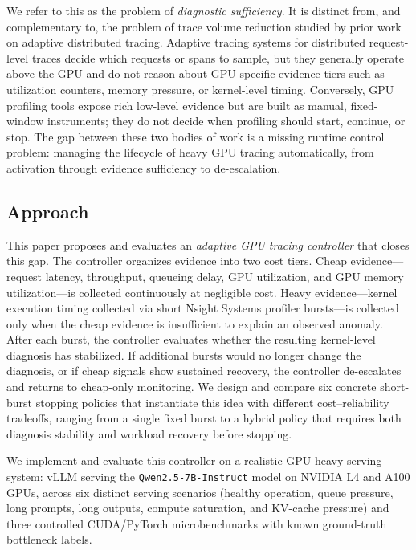 We refer to this as the problem of \emph{diagnostic sufficiency}.
It is distinct from, and complementary to, the problem of trace volume reduction studied by
prior work on adaptive distributed tracing.
Adaptive tracing systems for distributed request-level traces decide which requests or spans
to sample, but they generally operate above the GPU and do not reason about GPU-specific
evidence tiers such as utilization counters, memory pressure, or kernel-level timing.
Conversely, GPU profiling tools expose rich low-level evidence but are built as manual,
fixed-window instruments; they do not decide when profiling should start, continue, or stop.
The gap between these two bodies of work is a missing runtime control problem: managing the
lifecycle of heavy GPU tracing automatically, from activation through evidence sufficiency to
de-escalation.

\subsection{Approach}

This paper proposes and evaluates an \emph{adaptive GPU tracing controller} that closes this
gap.
The controller organizes evidence into two cost tiers.
Cheap evidence---request latency, throughput, queueing delay, GPU utilization, and GPU memory
utilization---is collected continuously at negligible cost.
Heavy evidence---kernel execution timing collected via short Nsight Systems profiler
bursts---is collected only when the cheap evidence is insufficient to explain an observed
anomaly.
After each burst, the controller evaluates whether the resulting kernel-level diagnosis has
stabilized.
If additional bursts would no longer change the diagnosis, or if cheap signals show sustained
recovery, the controller de-escalates and returns to cheap-only monitoring.
We design and compare six concrete short-burst stopping policies that instantiate this idea
with different cost--reliability tradeoffs, ranging from a single fixed burst to a hybrid
policy that requires both diagnosis stability and workload recovery before stopping.

We implement and evaluate this controller on a realistic GPU-heavy serving system: vLLM
serving the \texttt{Qwen2.5-7B-Instruct} model on NVIDIA L4 and A100 GPUs, across six
distinct serving scenarios (healthy operation, queue pressure, long prompts, long outputs,
compute saturation, and KV-cache pressure) and three controlled CUDA/PyTorch microbenchmarks
with known ground-truth bottleneck labels.


